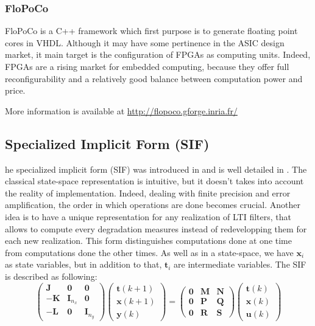 	\subsubsection{FloPoCo}
		FloPoCo is a C++ framework which first purpose is to generate floating point cores in VHDL.
		Although it may have some pertinence in the ASIC design market, it main target is the configuration of FPGAs as computing units.
		Indeed, FPGAs are a rising market for embedded computing, because they offer full reconfigurability and a relatively good balance between computation power and price.

		More information is available at \url{http://flopoco.gforge.inria.fr/}

	\subsection{Specialized Implicit Form (SIF)}
	he specialized implicit form (SIF) was introduced in \cite{sifd} and is well detailed in \cite{hilaire,sif}. 
	The classical state-space representation is intuitive,
	but it doesn't takes into account the reality of implementation.
	Indeed, dealing with finite precision and error amplification, the order in which operations are done becomes crucial.
	Another idea is to have a unique representation for any realization of LTI filters,
	that allows to compute every degradation measures instead of redevelopping them for each new realization.
	This form distinguishes computations done at one time from computations done the other times. As well as
	in a state-space, we have $\boldsymbol{x}_i$ as state variables, but in addition to that, $\boldsymbol{t}_i$ are intermediate variables.
	The SIF is described as following:
	\begin{equation} \label{sifdef}
		\begin{pmatrix}
			\boldsymbol{J} & \boldsymbol{0} & \boldsymbol{0} \\
			\boldsymbol{-K} & \boldsymbol{I}_{n_x} & \boldsymbol{0} \\
			\boldsymbol{-L} & \boldsymbol{0} & \boldsymbol{I}_{n_y} 
		\end{pmatrix}
		\begin{pmatrix}
			\boldsymbol{t} (k+1)  \\
			\boldsymbol{x} (k+1)  \\
			\boldsymbol{y} (k) 
		\end{pmatrix}
		=
		\begin{pmatrix}
			\boldsymbol{0} & \boldsymbol{M} & \boldsymbol{N} \\
			\boldsymbol{0} & \boldsymbol{P} & \boldsymbol{Q} \\
			\boldsymbol{0} & \boldsymbol{R} & \boldsymbol{S} 
		\end{pmatrix}
		\begin{pmatrix}
			\boldsymbol{t} (k)  \\
			\boldsymbol{x} (k)  \\
			\boldsymbol{u} (k) 
		\end{pmatrix}
	\end{equation}
